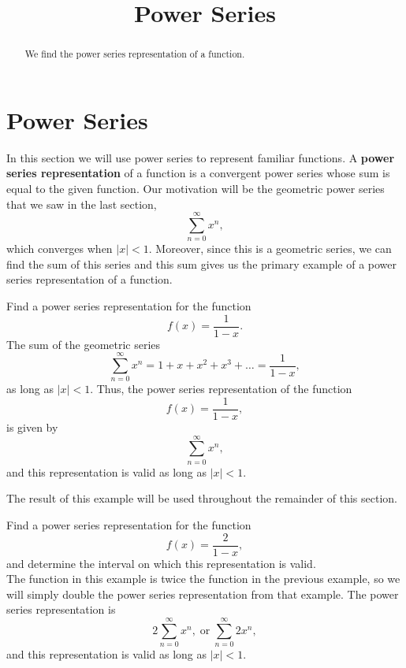 \documentclass{ximera}
\title{Power Series}
\begin{document}
\begin{abstract}
We find the power series representation of a function.
\end{abstract}

\maketitle

\section{Power Series}

In this section we will use power series to represent familiar functions.
A \textbf{power series representation} of a function is a convergent power series whose sum is equal to the given function.
Our motivation will be the geometric power series that we saw in the last section,
\[
\sum_{n=0}^\infty x^n,
\]
which converges when $|x| < 1$. Moreover, since this is a geometric series, we can find the sum of this series
and this sum gives us the primary example of a power series representation of a function.

\begin{example}[example 1]
Find a power series representation for the function 
\[
f(x) = \frac{1}{1-x}.
\]
The sum of the geometric series
\[
\sum_{n=0}^\infty x^n = 1 + x + x^2 + x^3 + \dots =  \frac{1}{1-x},
\]
as long as $|x| < 1$.  Thus, the power series representation of the function 
\[
f(x) = \frac{1}{1-x},
\]
is given by 
\[
\sum_{n=0}^\infty x^n,
\]
and this representation is valid as long as $|x| < 1$.
\end{example}

The result of this example will be used throughout the remainder of this section.

\begin{example}[example 2]
Find a power series representation for the function
\[
f(x) = \frac{2}{1-x},
\]
and determine the interval on which this representation is valid.\\
The function in this example is twice the function in the previous example, 
so we will simply double the power series representation from that example.
The power series representation is
\[
2\sum_{n=0}^\infty x^n,  \; \text{or} \; \sum_{n=0}^\infty 2x^n,
\]
and this representation is valid as long as $|x| < 1$.

\end{example}
\end{document}
